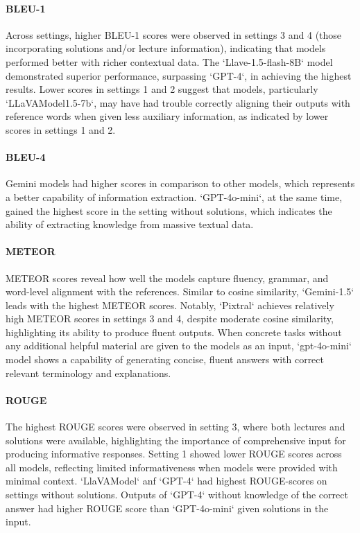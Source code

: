 \documentclass{article}
\begin{document}
\paragraph{BLEU-1}
Across settings, higher BLEU-1 scores were observed in settings 3 and 4 (those incorporating solutions and/or lecture information), indicating that models performed better with richer contextual data. The `Llave-1.5-flash-8B` model demonstrated superior performance, surpassing `GPT-4`, in achieving the highest results. Lower scores in settings 1 and 2 suggest that models, particularly `LLaVAModel1.5-7b`, may have had trouble correctly aligning their outputs with reference words when given less auxiliary information, as indicated by lower scores in settings 1 and 2. 

\paragraph{BLEU-4}
Gemini models had higher scores in comparison to other models, which represents a better capability of information extraction. `GPT-4o-mini`, at the same time, gained the highest score in the setting without solutions, which indicates the ability of extracting knowledge from massive textual data.

\paragraph{METEOR}
METEOR scores reveal how well the models capture fluency, grammar, and word-level alignment with the references. Similar to cosine similarity, `Gemini-1.5` leads with the highest METEOR scores. Notably, `Pixtral` achieves relatively high METEOR scores in settings 3 and 4, despite moderate cosine similarity, highlighting its ability to produce fluent outputs. When concrete tasks without any additional helpful material are given to the models as an input, `gpt-4o-mini` model shows a capability of generating concise, fluent answers with correct relevant terminology and explanations.

\paragraph{ROUGE}
The highest ROUGE scores were observed in setting 3, where both lectures and solutions were available, highlighting the importance of comprehensive input for producing informative responses. Setting 1 showed lower ROUGE scores across all models, reflecting limited informativeness when models were provided with minimal context.  `LlaVAModel` anf `GPT-4` had highest ROUGE-scores on settings without solutions. Outputs of `GPT-4` without knowledge of the correct answer had higher ROUGE score than `GPT-4o-mini` given solutions in the input.
\end{document}

